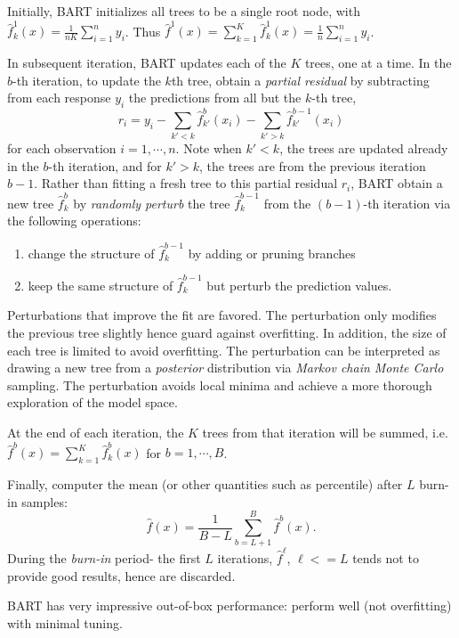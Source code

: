 \documentclass[
  letterpaper,
  DIV=11,
  numbers=noendperiod]{scrreprt}
\providecommand{\tightlist}{%
  \setlength{\itemsep}{0pt}\setlength{\parskip}{0pt}}\usepackage{longtable,booktabs,array}
\begin{document}
Initially, BART initializes all trees to be a single root node, with
\(\hat{f}^1_k(x)=\frac{1}{nK}\sum_{i=1}^n y_i\). Thus
\(\hat{f}^1(x)= \sum_{k=1}^K\hat{f}^1_k(x)=\frac{1}{n}\sum_{i=1}^n y_i\).

In subsequent iteration, BART updates each of the \(K\) trees, one at a
time. In the \(b\)-th iteration, to update the \(k\)th tree, obtain a
\emph{partial residual} by subtracting from each response \(y_i\) the
predictions from all but the \(k\)-th tree, \[
r_i = y_i -\sum_{k'<k}\hat{f}^b_{k'}(x_i) - \sum_{k'>k}\hat{f}^{b-1}_{k'}(x_i)
\] for each observation \(i=1, \cdots, n\). Note when \(k'<k\), the
trees are updated already in the \(b\)-th iteration, and for \(k'>k\),
the trees are from the previous iteration \(b-1\). Rather than fitting a
fresh tree to this partial residual \(r_i\), BART obtain a new tree
\(\hat{f}^b_k\) by \emph{randomly perturb} the tree \(\hat{f}^{b-1}_k\)
from the \((b-1)\)-th iteration via the following operations:

\begin{enumerate}
\def\labelenumi{\arabic{enumi}.}
\tightlist
\item
  change the structure of \(\hat{f}^{b-1}_k\) by adding or pruning
  branches
\item
  keep the same structure of \(\hat{f}^{b-1}_k\) but perturb the
  prediction values.
\end{enumerate}

Perturbations that improve the fit are favored. The perturbation only
modifies the previous tree slightly hence guard against overfitting. In
addition, the size of each tree is limited to avoid overfitting. The
perturbation can be interpreted as drawing a new tree from a
\emph{posterior} distribution via \emph{Markov chain Monte Carlo}
sampling. The perturbation avoids local minima and achieve a more
thorough exploration of the model space.

At the end of each iteration, the \(K\) trees from that iteration will
be summed, i.e.~\(\hat{f}^b(x)=\sum_{k=1}^K \hat{f}^b_k(x)\) for
\(b=1, \cdots, B\).

Finally, computer the mean (or other quantities such as percentile)
after \(L\) burn-in samples: \[
\hat{f}(x) = \frac{1}{B-L} \sum^B_{b=L+1} \hat{f}^b(x). 
\] During the \emph{burn-in} period- the first \(L\) iterations,
\(\hat{f}^{\ell}\), \(\ell <=L\) tends not to provide good results,
hence are discarded.

BART has very impressive out-of-box performance: perform well (not
overfitting) with minimal tuning.
\end{document}
